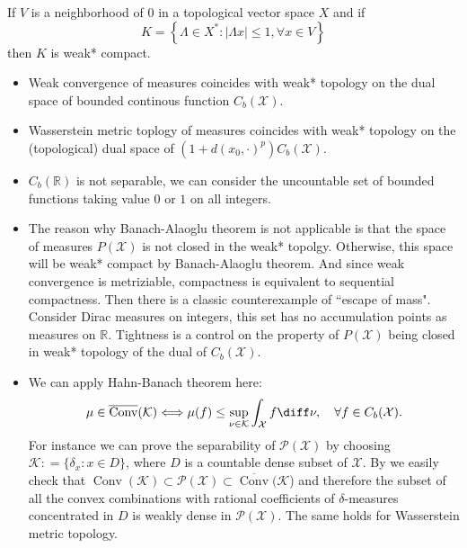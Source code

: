 \begin{thm}
	If \( V \) is a neighborhood of 0 in a topological vector space \( X \) and if
	\[ K = \left\{ \Lambda \in X ^ { * }: | \Lambda x | \leq 1, \forall x \in V \right\} \]
	then $K$ is weak* compact.
\end{thm}

\begin{rmk}
	\begin{itemize}
		\item Weak convergence of measures coincides with weak* topology on the dual space of bounded continous function $C_b(\mathcal{X})$.
		\item Wasserstein metric toplogy of measures coincides with weak* topology on the (topological) dual space of $(1 + d(x_0, \cdot)^p) C_b(\mathcal{X})$.
		\item $C_b(\mathbb{R})$ is not separable, we can consider the uncountable set of bounded functions taking value $0$ or $1$ on all integers.
		\item The reason why Banach-Alaoglu theorem is not applicable is that the space of measures $P(\mathcal{X})$ is not closed in the weak* topolgy. Otherwise, this space will be weak* compact by Banach-Alaoglu theorem. And since weak convergence is metriziable, compactness is equivalent to sequential compactness. Then there is a classic counterexample of ``escape of mass". Consider Dirac measures on integers, this set has no accumulation points as measures on $\mathbb{R}$. Tightness is a control on the property of $P(\mathcal{X})$ being closed in weak* topology of the dual of $C_b(\mathcal{X})$.
		\item We can apply Hahn-Banach theorem here:
		      \begin{equation}
			      \label{hahn_banach_application}
			      \mu \in \overline { \operatorname { Conv } } ( \mathcal { K } ) \Longleftrightarrow \mu(f) \leq \sup _ { \nu \in \mathcal { K } } \int _ { \mathcal{X} } f \diff \nu, \quad \forall f \in C _ { b }( \mathcal{X} ).
		      \end{equation}
		      For instance we can prove the separability of \( \mathscr { P } ( \mathcal{X} ) \) by choosing \( \mathcal { K }: = \{ \delta _ { x }: x \in D \} \), where \( D \) is a countable dense subset of \( \mathcal{X}\). By  we easily check that \( \operatorname { Conv } (\mathcal { K }) \subset \mathscr { P } ( \mathcal{X} ) \subset \overline { \operatorname { Conv } } (\mathcal { K } \)) and therefore the subset of all the convex combinations with rational coefficients of \( \delta \)-measures concentrated in \( D \) is weakly dense in \( \mathscr { P } ( \mathcal{X} ) \). The same holds for Wasserstein metric topology.


\end{itemize}
\end{rmk}
